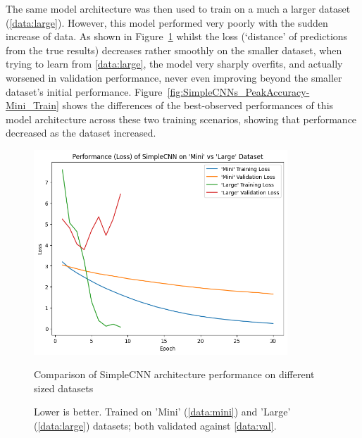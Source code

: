                 The same model architecture was then used to train on a much a larger dataset (\ref{data:large}). However, this model performed very poorly with the sudden increase of data. As shown in Figure~\ref{fig:SimpleCNNs_TrainLoss-Mini_Train} whilst the loss (`distance' of predictions from the true results) decreases rather smoothly on the smaller dataset, when trying to learn from \ref{data:large}, the model very sharply overfits, and actually worsened in validation performance, never even improving beyond the smaller dataset's initial performance. Figure~\ref{fig:SimpleCNNs_PeakAccuracy-Mini_Train} shows the differences of the best-observed performances of this model architecture across these two training scenarios, showing that performance decreased as the dataset increased.
        
                \begin{figure}[h]
                    \centering
                    \includegraphics[width=0.85\textwidth]{images/SimpleCNNs_TrainLoss.png}
                    \caption{Comparison of SimpleCNN architecture performance on different sized datasets}
                    \label{fig:SimpleCNNs_TrainLoss-Mini_Train}
                    \caption*{Lower is better. Trained on 'Mini' (\ref{data:mini}) and 'Large' (\ref{data:large}) datasets; both validated against \ref{data:val}.}
                \end{figure}
        
